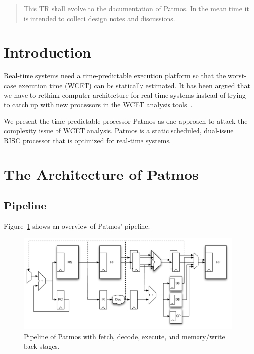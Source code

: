 \documentclass{IEEEtran}
\begin{document}
\begin{abstract}
This TR shall evolve to the documentation of Patmos. In the mean time it is intended to collect design notes and discussions.

\end{abstract}



\section{Introduction}

Real-time systems need a time-predictable execution platform so that the worst-case execution time (WCET) can be statically estimated. It has been argued that we have to rethink computer architecture for real-time systems instead of trying to catch up with new processors in the WCET analysis tools~\cite{tpca:jes, pret:dac2007}.

We present the time-predictable processor Patmos as one approach to attack the complexity issue of WCET analysis. Patmos is a static scheduled, dual-issue RISC processor that is optimized for real-time systems.





\section{The Architecture of Patmos}
\label{sec:arch}

\subsection{Pipeline}

Figure~\ref{fig:pipeline} shows an overview of Patmos' pipeline.

\begin{figure}[t]
    \centering
    \includegraphics[scale=0.6]{fig/pipeline}
    \caption{Pipeline of Patmos with fetch, decode, execute, and memory/write back stages.}\label{fig:pipeline}
\end{figure}
\end{document}
